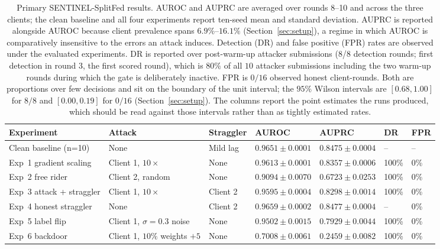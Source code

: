 \documentclass[pdflatex,sn-mathphys-num]{sn-jnl}
\begin{document}
\begin{table}[htbp]
\caption{Primary SENTINEL-SplitFed results. AUROC and AUPRC are averaged over rounds 8--10 and across the three clients; the clean baseline and all four experiments report ten-seed mean and standard deviation. AUPRC is reported alongside AUROC because client prevalence spans $6.9\%$--$16.1\%$ (Section~\ref{sec:setup}), a regime in which AUROC is comparatively insensitive to the errors an attack induces. Detection (DR) and false positive (FPR) rates are observed under the evaluated experiments. DR is reported over post-warm-up attacker submissions (8/8 detection rounds; first detection in round 3, the first scored round), which is $80\%$ of all $10$ attacker submissions including the two warm-up rounds during which the gate is deliberately inactive. FPR is $0/16$ observed honest client-rounds. Both are proportions over few decisions and sit on the boundary of the unit interval; the $95\%$ Wilson intervals are $[0.68,1.00]$ for $8/8$ and $[0.00,0.19]$ for $0/16$ (Section~\ref{sec:setup}). The columns report the point estimates the runs produced, which should be read against those intervals rather than as tightly estimated rates.}
\label{tab:main-results}
\centering
\begin{tabular}{lllllll}
\toprule
Experiment & Attack & Straggler & AUROC & AUPRC & DR & FPR \\
\midrule
Clean baseline (n=10) & None & Mild lag & $0.9651\pm0.0001$ & $0.8475\pm0.0004$ & -- & -- \\
Exp~1 gradient scaling & Client 1, $10\times$ & None & $0.9613\pm0.0001$ & $0.8357\pm0.0006$ & 100\% & 0\% \\
Exp~2 free rider & Client 2, random & None & $0.9094\pm0.0070$ & $0.6723\pm0.0253$ & 100\% & 0\% \\
Exp~3 attack + straggler & Client 1, $10\times$ & Client 2 & $0.9595\pm0.0004$ & $0.8298\pm0.0014$ & 100\% & 0\% \\
Exp~4 honest straggler & None & Client 2 & $0.9659\pm0.0002$ & $0.8477\pm0.0004$ & -- & 0\% \\
Exp~5 label flip & Client 1, $\sigma{=}0.3$ noise & None & $0.9502\pm0.0015$ & $0.7929\pm0.0044$ & 100\% & 0\% \\
Exp~6 backdoor & Client 1, $10\%$ weights $+5$ & None & $\mathbf{0.7008}\pm0.0061$ & $\mathbf{0.2459}\pm0.0082$ & 100\% & 0\% \\
\bottomrule
\end{tabular}
\end{table}
\end{document}
